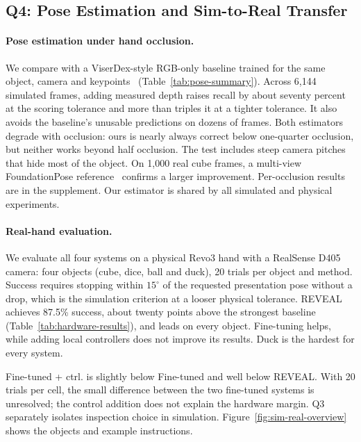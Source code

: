 \subsection{Q4: Pose Estimation and Sim-to-Real Transfer}
\paragraph{Pose estimation under hand occlusion.}
We compare with a ViserDex-style RGB-only baseline trained for the same object, camera and keypoints~\cite{bhardwaj2026viserdex} (Table~\ref{tab:pose-summary}). Across 6,144 simulated frames, adding measured depth raises recall by about seventy percent at the scoring tolerance and more than triples it at a tighter tolerance. It also avoids the baseline's unusable predictions on dozens of frames. Both estimators degrade with occlusion: ours is nearly always correct below one-quarter occlusion, but neither works beyond half occlusion. The test includes steep camera pitches that hide most of the object. On 1,000 real cube frames, a multi-view FoundationPose reference~\cite{wen2024foundationpose} confirms a larger improvement. Per-occlusion results are in the supplement. Our estimator is shared by all simulated and physical experiments.



\paragraph{Real-hand evaluation.}
We evaluate all four systems on a physical Revo3 hand with a RealSense D405 camera: four objects (cube, dice, ball and duck), 20 trials per object and method. Success requires stopping within $15^\circ$ of the requested presentation pose without a drop, which is the simulation criterion at a looser physical tolerance. REVEAL achieves 87.5\% success, about twenty points above the strongest baseline (Table~\ref{tab:hardware-results}), and leads on every object. Fine-tuning helps, while adding local controllers does not improve its results. Duck is the hardest for every system.

Fine-tuned + ctrl. is slightly below Fine-tuned and well below REVEAL. With 20 trials per cell, the small difference between the two fine-tuned systems is unresolved; the control addition does not explain the hardware margin. Q3 separately isolates inspection choice in simulation. Figure~\ref{fig:sim-real-overview} shows the objects and example instructions.


